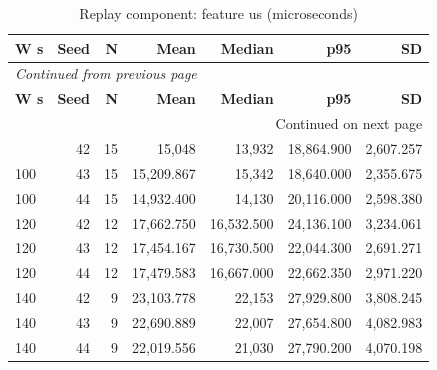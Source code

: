 \documentclass[10pt,a4paper]{article}
\begin{document}
\begin{longtable}{@{}lrrrrrr@{}}
\caption{Replay component:\allowbreak{} feature us (microseconds)}\\
\toprule
\textbf{W s} & \textbf{Seed} & \textbf{N} & \textbf{Mean} & \textbf{Median} & \textbf{p95} & \textbf{SD} \\
\midrule\endfirsthead
\multicolumn{7}{l}{\small\itshape Continued from previous page}\\
\toprule
\textbf{W s} & \textbf{Seed} & \textbf{N} & \textbf{Mean} & \textbf{Median} & \textbf{p95} & \textbf{SD} \\
\midrule\endhead
\midrule\multicolumn{7}{r}{\small Continued on next page}\\\endfoot
\bottomrule\endlastfoot
100 & 42 & 15 & 15,048 & 13,932 & 18,864.900 & 2,607.257 \\
100 & 43 & 15 & 15,209.867 & 15,342 & 18,640.000 & 2,355.675 \\
100 & 44 & 15 & 14,932.400 & 14,130 & 20,116.000 & 2,598.380 \\
120 & 42 & 12 & 17,662.750 & 16,532.500 & 24,136.100 & 3,234.061 \\
120 & 43 & 12 & 17,454.167 & 16,730.500 & 22,044.300 & 2,691.271 \\
120 & 44 & 12 & 17,479.583 & 16,667.000 & 22,662.350 & 2,971.220 \\
140 & 42 & 9 & 23,103.778 & 22,153 & 27,929.800 & 3,808.245 \\
140 & 43 & 9 & 22,690.889 & 22,007 & 27,654.800 & 4,082.983 \\
140 & 44 & 9 & 22,019.556 & 21,030 & 27,790.200 & 4,070.198 \\
\end{longtable}\endgroup
\begingroup\small\setlength{\tabcolsep}{4pt}\renewcommand{\arraystretch}{1.12}
\end{document}
